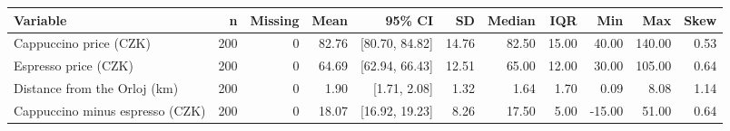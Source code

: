 \begin{tabular}{lrrrrrrrrrr}
  \toprule
Variable & n & Missing & Mean & 95\% CI & SD & Median & IQR & Min & Max & Skew \\ 
  \midrule
Cappuccino price (CZK) & 200 & 0 & 82.76 & [80.70, 84.82] & 14.76 & 82.50 & 15.00 & 40.00 & 140.00 & 0.53 \\ 
  Espresso price (CZK) & 200 & 0 & 64.69 & [62.94, 66.43] & 12.51 & 65.00 & 12.00 & 30.00 & 105.00 & 0.64 \\ 
  Distance from the Orloj (km) & 200 & 0 & 1.90 & [1.71, 2.08] & 1.32 & 1.64 & 1.70 & 0.09 & 8.08 & 1.14 \\ 
  Cappuccino minus espresso (CZK) & 200 & 0 & 18.07 & [16.92, 19.23] & 8.26 & 17.50 & 5.00 & -15.00 & 51.00 & 0.64 \\ 
   \bottomrule
\end{tabular}
